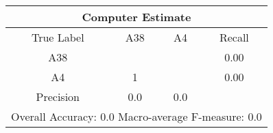 \begin{tabular}{|c||c|c||c|}
\hline 
\multicolumn{4}{|c|}{Computer Estimate}\\
\hline 
True Label & A38 & A4 & Recall \\
\hline 
A38 &  & & 0.00\\
A4 & 1 &  & 0.00\\
\hline 
Precision & 0.0 & 0.0 & \\
\hline 
\multicolumn{4}{|c|}{Overall Accuracy: 0.0 Macro-average F-measure: 0.0}\\
\hline 
\end{tabular} 
